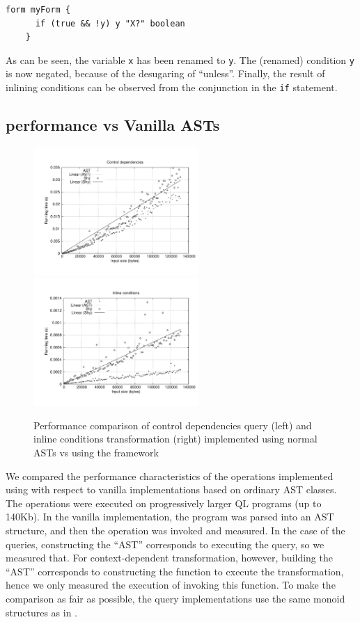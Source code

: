   \begin{lstlisting}[language=ql]
    form myForm {
      if (true && !y) y "X?" boolean
    }
  \end{lstlisting}

  As can be seen, the variable \lstinline{x} has been renamed to \lstinline{y}.
The (renamed) condition \lstinline{y} is now negated, because of the desugaring of ``unless''.
Finally, the result of inlining conditions can be observed from the conjunction in the \lstinline[language=ql]{if} statement.

  
\subsection{\name performance vs Vanilla ASTs}

\begin{figure}[t]
  \hspace*{-.1\textwidth}
  \includegraphics[width=0.56\textwidth]{plots/controldeps}
  \includegraphics[width=0.56\textwidth]{plots/inline}
  \caption{Performance comparison of control dependencies query (left) and inline conditions transformation (right) implemented using normal ASTs vs using the \name framework\label{FIG:performance}}
\end{figure}

We compared the performance characteristics of the operations implemented using \name with respect to vanilla implementations based on ordinary AST classes.
The operations were executed on progressively larger QL programs (up to 140Kb).
In the vanilla implementation, the program was parsed into an AST structure, and then the operation was invoked and measured.
In the case of the \name queries, constructing the ``AST'' corresponds to executing the query, so we measured that.
For context-dependent transformation, however, building the ``AST'' corresponds to constructing the function to execute the transformation, hence we only measured the execution of invoking this function. 
To make the comparison as fair as possible, the query implementations use the same monoid structures as in \name.

